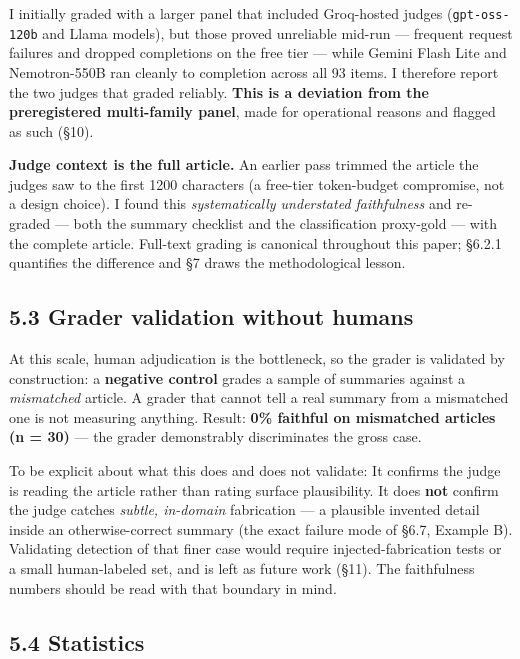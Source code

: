 \documentclass[11pt]{article}
\begin{document}
I initially graded with a larger panel that included Groq-hosted judges
(\texttt{gpt-oss-120b} and Llama models), but those proved unreliable
mid-run --- frequent request failures and dropped completions on the
free tier --- while Gemini Flash Lite and Nemotron-550B ran cleanly to
completion across all 93 items. I therefore report the two judges that
graded reliably. \textbf{This is a deviation from the preregistered
multi-family panel}, made for operational reasons and flagged as such
(§10).

\textbf{Judge context is the full article.} An earlier pass trimmed the
article the judges saw to the first 1200 characters (a free-tier
token-budget compromise, not a design choice). I found this
\emph{systematically understated faithfulness} and re-graded --- both
the summary checklist and the classification proxy-gold --- with the
complete article. Full-text grading is canonical throughout this paper;
§6.2.1 quantifies the difference and §7 draws the methodological lesson.

\subsection{5.3 Grader validation without
humans}\label{grader-validation-without-humans}

At this scale, human adjudication is the bottleneck, so the grader is
validated by construction: a \textbf{negative control} grades a sample
of summaries against a \emph{mismatched} article. A grader that cannot
tell a real summary from a mismatched one is not measuring anything.
Result: \textbf{0\% faithful on mismatched articles (n = 30)} --- the
grader demonstrably discriminates the gross case.

To be explicit about what this does and does not validate: It confirms
the judge is reading the article rather than rating surface
plausibility. It does \textbf{not} confirm the judge catches
\emph{subtle, in-domain} fabrication --- a plausible invented detail
inside an otherwise-correct summary (the exact failure mode of §6.7,
Example B). Validating detection of that finer case would require
injected-fabrication tests or a small human-labeled set, and is left as
future work (§11). The faithfulness numbers should be read with that
boundary in mind.

\subsection{5.4 Statistics}\label{statistics}
\end{document}
